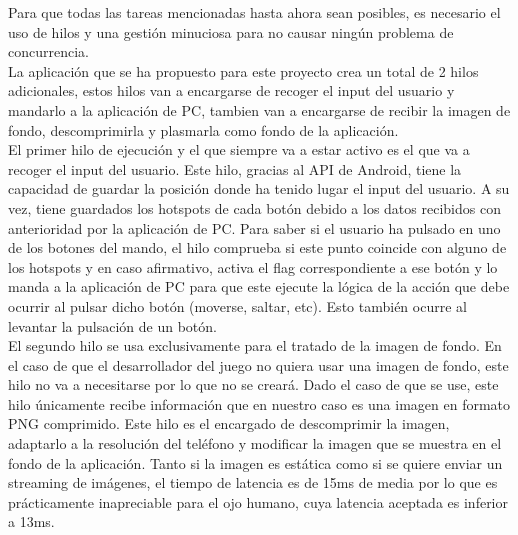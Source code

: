 Para que todas las tareas mencionadas hasta ahora sean posibles, es necesario el uso de hilos y una gesti\'on minuciosa para no causar ning\'un problema de concurrencia.
\\
La aplicaci\'on que se ha propuesto para este proyecto crea un total de 2 hilos adicionales, estos hilos van a encargarse de recoger el input del usuario y mandarlo a la aplicaci\'on de PC, tambien van a encargarse de recibir la imagen de fondo, descomprimirla y plasmarla como fondo de la aplicaci\'on. 
\\
El primer hilo de ejecuci\'on y el que siempre va a estar activo es el que va a recoger el input del usuario. Este hilo, gracias al API de Android, tiene la capacidad de guardar la posici\'on donde ha tenido lugar el input del usuario. A su vez, tiene guardados los hotspots de cada bot\'on debido a los datos recibidos con anterioridad por la aplicaci\'on de PC. Para saber si el usuario ha pulsado en uno de los botones del mando, el hilo comprueba si este punto coincide con alguno de los hotspots y en caso afirmativo, activa el flag correspondiente a ese bot\'on y lo manda a la aplicaci\'on de PC para que este ejecute la l\'ogica de la acci\'on que debe ocurrir al pulsar dicho bot\'on (moverse, saltar, etc). Esto tambi\'en ocurre al levantar la pulsaci\'on de un bot\'on.
\\
El segundo hilo se usa exclusivamente para el tratado de la imagen de fondo. En el caso de que el desarrollador del juego no quiera usar una imagen de fondo, este hilo no va a necesitarse por lo que no se crear\'a. Dado el caso de que se use, este hilo \'unicamente recibe informaci\'on que en nuestro caso es una imagen en formato PNG comprimido. Este hilo es el encargado de descomprimir la imagen, adaptarlo a la resoluci\'on del tel\'efono y modificar la imagen que se muestra en el fondo de la aplicaci\'on. Tanto si la imagen es est\'atica como si se quiere enviar un streaming de im\'agenes, el tiempo de latencia es de 15ms de media por lo que es pr\'acticamente inapreciable para el ojo humano, cuya latencia aceptada es inferior a 13ms.

